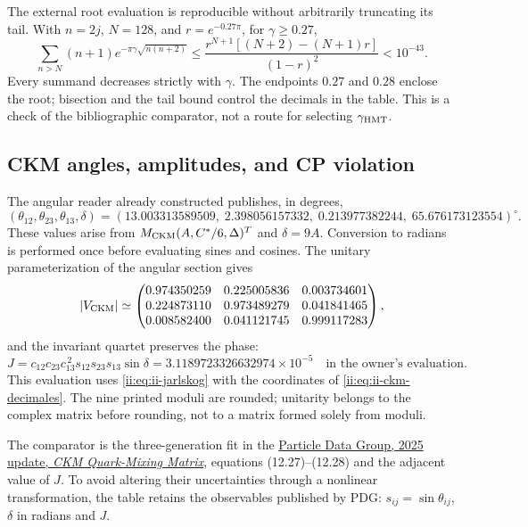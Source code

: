 The external root evaluation is reproducible without arbitrarily
truncating its tail. With \(n=2j\), \(N=128\), and
\(r=e^{-0.27\pi}\), for \(\gamma\geq0.27\),
\[
 \sum_{n>N}(n+1)e^{-\pi\gamma\sqrt{n(n+2)}}
 \leq \frac{r^{N+1}[(N+2)-(N+1)r]}{(1-r)^2}<10^{-43}.
\]
Every summand decreases strictly with \(\gamma\). The endpoints
\(0.27\) and \(0.28\) enclose the root; bisection and the tail bound
control the decimals in the table. This is a check of the
bibliographic comparator, not a route for selecting \(\gamma_{\rm HMT}\).

\subsection{CKM angles, amplitudes, and CP violation}

The angular reader already constructed publishes, in degrees,
\begin{equation}
 (\theta_{12},\theta_{23},\theta_{13},\delta)
 =(13.003313589509,\;2.398056157332,\;
 0.213977382244,\;65.676173123554)^\circ.
 \label{ii:eq:ii-ckm-decimales}
\end{equation}
These values arise from \(M_{\rm CKM}(A,C^*/6,\Delta)^T\) and
\(\delta=9A\). Conversion to radians is performed once before
evaluating sines and cosines. The unitary parameterization of the angular
section gives
\[
 |V_{\rm CKM}|\simeq
 \begin{pmatrix}
 0.974350259&0.225005836&0.003734601\\
 0.224873110&0.973489279&0.041841465\\
 0.008582400&0.041121745&0.999117283
 \end{pmatrix},
\]
and the invariant quartet preserves the phase:
\[
 J=c_{12}c_{23}c_{13}^{\,2}s_{12}s_{23}s_{13}\sin\delta
 =3.1189723326632974\times10^{-5}\quad
 \text{in the owner's evaluation.}
\]
This evaluation uses \eqref{ii:eq:ii-jarlskog} with the coordinates of
\eqref{ii:eq:ii-ckm-decimales}. The nine printed moduli are rounded; unitarity belongs
to the complex matrix before rounding, not to a matrix formed
solely from moduli.

The comparator is the three-generation fit in the
\href{https://pdg.lbl.gov/2025/reviews/rpp2025-rev-ckm-matrix.pdf}
{Particle Data Group, 2025 update, \emph{CKM Quark-Mixing Matrix}},
equations (12.27)--(12.28) and the adjacent value of \(J\). To avoid
altering their uncertainties through a nonlinear transformation, the table
retains the observables published by PDG: \(s_{ij}=\sin\theta_{ij}\),
\(\delta\) in radians and \(J\).

